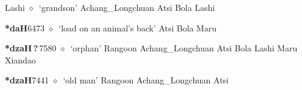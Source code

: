 \begin{list}{}{\leftmargin=1.5em \itemindent=-1.5em}
\hspace{1ex}
         Lashi 
\hspace{1ex}
         $\diamond$~`grandson'
         Achang\_Longchuan 
\hspace{1ex}
         Atsi 
\hspace{1ex}
         Bola 
\hspace{1ex}
         Lashi 
  \item {\footnotesize \textbf{*daH}}{\tiny 6473}
\hspace{1ex}
         $\diamond$~`load on an animal's back'
         Atsi 
\hspace{1ex}
         Bola 
\hspace{1ex}
         Maru 
  \item {\footnotesize \textbf{*dzaH\,?\,}}{\tiny 7580}
\hspace{1ex}
         $\diamond$~`orphan'
         Rangoon 
\hspace{1ex}
         Achang\_Longchuan 
\hspace{1ex}
         Atsi 
\hspace{1ex}
         Bola 
\hspace{1ex}
         Lashi 
\hspace{1ex}
         Maru 
\hspace{1ex}
         Xiandao 
  \item {\footnotesize \textbf{*dzaH}}{\tiny 7441}
\hspace{1ex}
         $\diamond$~`old man'
         Rangoon 
\hspace{1ex}
         Achang\_Longchuan 
\hspace{1ex}
         Atsi 
\hspace{1ex}

\end{list}
